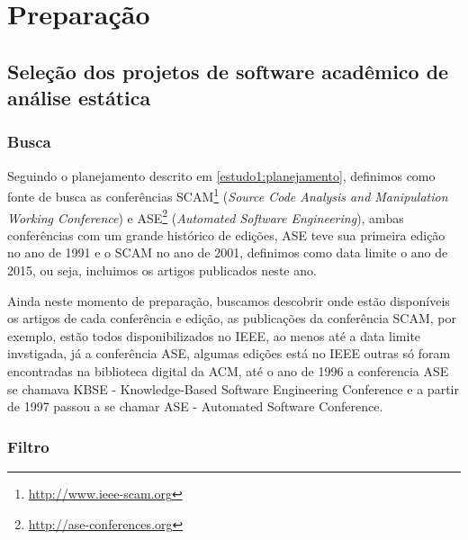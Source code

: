 
\section{Preparação} \label{estudo1:preparacao}

\subsection{Seleção dos projetos de software acadêmico de análise estática} %

\subsubsection{Busca}


Seguindo o planejamento descrito em \ref{estudo1:planejamento}, definimos como
fonte de busca as conferências SCAM\footnote{\url{http://www.ieee-scam.org}}
({\it Source Code Analysis and Manipulation Working Conference}) e
ASE\footnote{\url{http://ase-conferences.org}} ({\it Automated Software
Engineering}), ambas conferências com um grande histórico de edições, ASE teve
sua primeira edição no ano de 1991 e o SCAM no ano de 2001, definimos como data
limite o ano de 2015, ou seja, incluimos os artigos publicados neste ano.

Ainda neste momento de preparação, buscamos descobrir onde estão disponíveis os
artigos de cada conferência e edição, as publicações da conferência SCAM, por
exemplo, estão todos disponibilizados no IEEE, ao menos até a data limite
invstigada, já a conferência ASE, algumas edições está no IEEE outras só foram
encontradas na biblioteca digital da ACM, até o ano de 1996 a conferencia ASE
se chamava KBSE - Knowledge-Based Software Engineering Conference e a partir de
1997 passou a se chamar ASE - Automated Software Conference.

\subsubsection{Filtro}


